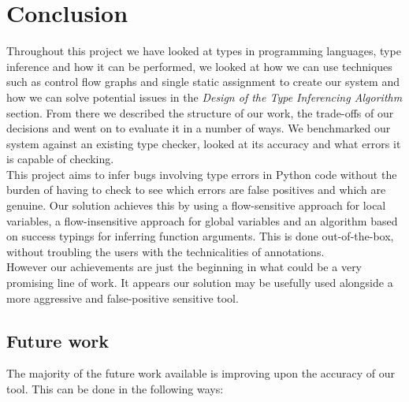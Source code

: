 \documentclass[12pt, titlepage]{article}
\begin{document}
\section{Conclusion}
Throughout this project we have looked at types in programming languages, type inference and how it can be performed, we looked at how we can use techniques such as control flow graphs and single static assignment to create our system and how we can solve potential issues in the \textit{Design of the Type Inferencing Algorithm} section. From there we described the structure of our work, the trade-offs of our decisions and went on to evaluate it in a number of ways. We benchmarked our system against an existing type checker, looked at its accuracy and what errors it is capable of checking. \\
\indent This project aims to infer bugs involving type errors in Python code without the burden of having to check to see which errors are false positives and which are genuine. Our solution achieves this by using a flow-sensitive approach for local variables, a flow-insensitive approach for global variables and an algorithm based on success typings for inferring function arguments. This is done out-of-the-box, without troubling the users with the technicalities of annotations. \\
\indent However our achievements are just the beginning in what could be a very promising line of work. It appears our solution may be usefully used alongside a more aggressive and false-positive sensitive tool.

\subsection{Future work}
The majority of the future work available is improving upon the accuracy of our tool. This can be done in the following ways:
\end{document}
